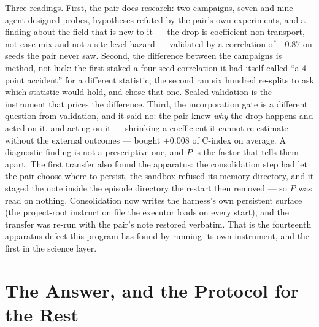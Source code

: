 Three readings. First, the pair does research: two campaigns, seven and nine agent-designed probes, hypotheses refuted by the pair's own experiments, and a finding about the field that is new to it --- the drop is coefficient non-transport, not case mix and not a site-level hazard --- validated by a correlation of $-0.87$ on seeds the pair never saw. Second, the difference between the campaigns is method, not luck: the first staked a four-seed correlation it had itself called ``a 4-point accident'' for a different statistic; the second ran six hundred re-splits to ask which statistic would hold, and chose that one. Sealed validation is the instrument that prices the difference. Third, the incorporation gate is a different question from validation, and it said no: the pair knew \emph{why} the drop happens and acted on it, and acting on it --- shrinking a coefficient it cannot re-estimate without the external outcomes --- bought $+0.008$ of C-index on average. A diagnostic finding is not a prescriptive one, and $P$ is the factor that tells them apart. The first transfer also found the apparatus: the consolidation step had let the pair choose where to persist, the sandbox refused its memory directory, and it staged the note inside the episode directory the restart then removed --- so $P$ was read on nothing. Consolidation now writes the harness's own persistent surface (the project-root instruction file the executor loads on every start), and the transfer was re-run with the pair's note restored verbatim. That is the fourteenth apparatus defect this program has found by running its own instrument, and the first in the science layer.

\section{The Answer, and the Protocol for the Rest}\label{sec:answer}

